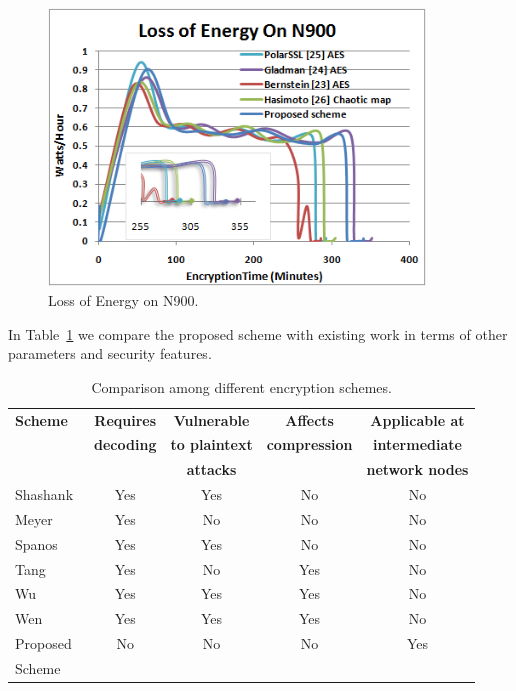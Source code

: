 \documentclass[preprint]{elsarticle}
\begin{document}
\begin{figure}[!ht]
\centering
\includegraphics[width=10cm]{figure10.png}
\caption{Loss of Energy on N900.}
\label{f10}
\end{figure} 



In Table~\ref{table4} we compare the proposed scheme with existing work in terms of other parameters and security features.


\begin{table}[!ht]
\centering
\begin{tabular}{p{2.2cm}| c c c c }
\hline 
 \small   \textbf{Scheme}   &
\small  \textbf{Requires}&
\small \textbf{Vulnerable}   &   \textbf{Affects}  &       
\small \textbf{Applicable at} \\ 
& \small \textbf{decoding} & \small \textbf{to plaintext} & \small \textbf{compression}  &  \small \textbf{intermediate}  \\
 &  & \small \textbf{attacks}  &  &\small \textbf{network nodes}  \\ \hline
 	 Shashank~\cite{Khanvilkar2006}  &  Yes  & Yes   &   No     &  No   \\ \hline
 	 Meyer~\cite{Meyer1995}  &  Yes  & No    &   No     &  No   \\ \hline
 	 Spanos~\cite{Spanos1995}  &  Yes  & Yes   &   No     &  No   \\ \hline
 	 Tang~\cite{Tang1996} &  Yes  & No    &   Yes    &  No   \\ \hline
 	 Wu~\cite{Wu2005}  &  Yes  & Yes   &   Yes    &  No   \\ \hline
 	 Wen~\cite{Jiangtao2006} &  Yes  & Yes   &   Yes    &  No   \\ \hline
 	 Proposed  &   No  & No    &   No     &  Yes   \\ 
 	 Scheme  &     &     &        &     \\ \hline
\end{tabular}
\caption{Comparison among different encryption schemes.}
\label{table4}
\end{table}
\end{document}
